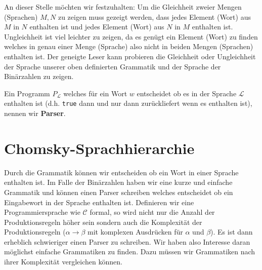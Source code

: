 An dieser Stelle möchten wir festzuhalten: Um die Gleichheit zweier Mengen (Sprachen) $M,N$ zu zeigen muss gezeigt werden, dass jedes Element (Wort) aus $M$ in $N$ enthalten ist
und jedes Element (Wort) aus $N$ in $M$ enthalten ist.
Ungleichheit ist viel leichter zu zeigen, da es genügt ein Element (Wort) zu finden welches in genau einer Menge (Sprache) also nicht in beiden Mengen (Sprachen) enthalten ist. Der geneigte Leser kann probieren die Gleichheit oder Ungleichheit der Sprache unserer oben definierten Grammatik und der Sprache der Binärzahlen zu zeigen.

\begin{defn}
Ein Programm $P_{\mathcal{L}}$ welches für ein Wort $w$ entscheidet ob es in der Sprache $\mathcal{L}$ enthalten ist (d.h. \verb|true| dann und nur dann zurückliefert wenn es enthalten ist), nennen wir \textbf{Parser}.
\end{defn}

\section{Chomsky-Sprachhierarchie}
Durch die Grammatik können wir entscheiden ob ein Wort in einer Sprache enthalten ist.
Im Falle der Binärzahlen haben wir eine kurze und einfache Grammatik und können einen Parser schreiben
welches entscheidet ob ein Eingabewort in der Sprache enthalten ist.
Definieren wir eine Programmiersprache wie $\mathcal{C}$ formal, so wird nicht nur die Anzahl der Produktionsregeln höher sein
sondern auch die Komplexität der Produktionsregeln ($\alpha \to \beta$ mit komplexen Ausdrücken für $\alpha$ und $\beta$).
Es ist dann erheblich schwieriger einen Parser zu schreiben.
Wir haben also Interesse daran möglichst einfache Grammatiken zu finden. Dazu müssen wir
Grammatiken nach ihrer Komplexität vergleichen können.

